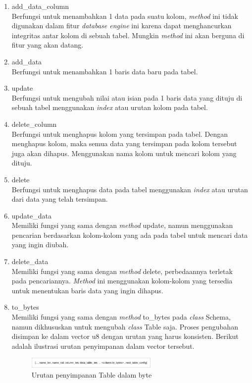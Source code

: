 \begin{enumerate}
	\item add\_data\_column \\
	Berfungsi untuk menambahkan 1 data pada suatu kolom, \emph{method} ini tidak digunakan dalam fitur \emph{database engine} ini karena dapat menghancurkan
  integritas antar kolom di sebuah tabel. Mungkin \emph{method} ini akan berguna di fitur yang akan datang.

	\item add\_data \\
	Berfungsi untuk menambahkan 1 baris data baru pada tabel.

	\item update \\
	Berfungsi untuk mengubah nilai atau isian pada 1 baris data yang dituju di sebuah tabel menggunakan \emph{index} atau urutan kolom pada tabel.

	\item delete\_column \\
	Berfungsi untuk menghapus kolom yang tersimpan pada tabel. Dengan menghapus kolom, maka semua data yang tersimpan pada kolom tersebut juga akan dihapus.
  Menggunakan nama kolom untuk mencari kolom yang dituju.

	\item delete \\
	Berfungsi untuk menghapus data pada tabel menggunakan \emph{index} atau urutan dari data yang telah tersimpan.
  
	\item update\_data \\
  Memiliki fungsi yang sama dengan \emph{method} update, namun menggunakan pencarian berdasarkan kolom-kolom yang ada pada tabel untuk mencari data yang ingin diubah.
  
	\item delete\_data \\
  Memiliki fungsi yang sama dengan \emph{method} delete, perbedaannya terletak pada pencariannya. \emph{Method} ini menggunakan kolom-kolom yang tersedia untuk menentukan
  baris data yang ingin dihapus.

	\item to\_bytes \\
  Memiliki fungsi yang sama dengan \emph{method} to\_bytes pada \emph{class} Schema, namun dikhususkan untuk mengubah \emph{class} Table saja. Proses pengubahan disimpan ke dalam vector
  u8 dengan urutan yang harus konsisten. Berikut adalah ilustrasi urutan penyimpanan dalam vector tersebut.

	\begin{figure}[H]
		\centering{}
			\includegraphics[width=0.6\textwidth]{gambar/bab4/urutan-penyimpanan-table.png}
		\caption{Urutan penyimpanan Table dalam byte}
		\end{figure}



\end{enumerate}
